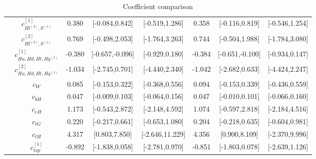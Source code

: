 \documentclass{article}
\begin{document}
\begin{table}[H]
\begin{tabular}{|c|c|c|c|c|c|c|c|}
 & $c_{Hl^{(3)},ll^{(1)}}^{[1]}$ & 0.380 & [-0.084,0.842] & [-0.519,1.286]  & 0.358 & [-0.116,0.819] & [-0.546,1.254]  \\ \cline{2-8}
 & $c_{Hl^{(3)},ll^{(1)}}^{[2]}$ & 0.769 & [-0.498,2.053] & [-1.764,3.263]  & 0.744 & [-0.504,1.988] & [-1.784,3.080]  \\ \cline{2-8}
 & $c_{Hu,Hd,Ht,Hq^{(1)}}^{[1]}$ & -0.380 & [-0.657,-0.096] & [-0.929,0.180]  & -0.384 & [-0.651,-0.100] & [-0.934,0.147]  \\ \cline{2-8}
 & $c_{Hu,Hd,Ht,Hq^{(1)}}^{[2]}$ & -1.034 & [-2.745,0.701] & [-4.440,2.340]  & -1.042 & [-2.682,0.633] & [-4.424,2.247]  \\ \cline{2-8}
 & $c_{W}$ & 0.085 & [-0.153,0.322] & [-0.368,0.556]  & 0.094 & [-0.153,0.339] & [-0.436,0.559]  \\ \cline{2-8}
 & $c_{bH}$ & 0.047 & [-0.009,0.103] & [-0.064,0.156]  & 0.047 & [-0.010,0.101] & [-0.066,0.160]  \\ \cline{2-8}
 & $c_{eH}$ & 1.173 & [-0.543,2.872] & [-2.148,4.592]  & 1.074 & [-0.597,2.818] & [-2.184,4.516]  \\ \cline{2-8}
 & $c_{tG}$ & 0.220 & [-0.217,0.661] & [-0.653,1.080]  & 0.204 & [-0.218,0.635] & [-0.604,0.981]  \\ \cline{2-8}
 & $c_{tH}$ & 4.317 & [0.803,7.850] & [-2.646,11.229]  & 4.356 & [0.900,8.109] & [-2.370,9.996]  \\ \cline{2-8}
 & $c_{top}^{[1]}$ & -0.892 & [-1.838,0.058] & [-2.781,0.970]  & -0.851 & [-1.803,0.078] & [-2.639,1.126]  \\ \cline{2-8}
\hline
\end{tabular}
\caption{Coefficient comparison}
\end{table}
\end{document}
